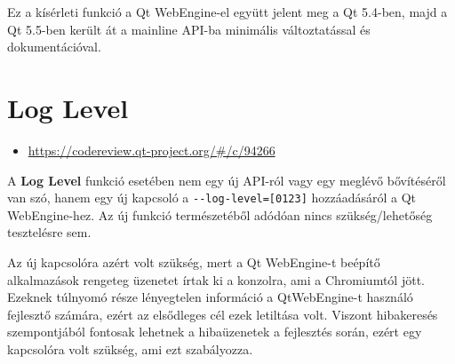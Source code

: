 \documentclass[12pt]{report}
\let\origurl\url
\renewcommand{\url}[1]{%
    \textcolor{blue}{\origurl{#1}}
}
\newcommand{\gerrit}[1]{%
    \textcolor{qtgreen}{\origurl{https://codereview.qt-project.org/\#/c/#1}}
}
\begin{document}
Ez a kísérleti funkció a Qt WebEngine-el együtt jelent meg a Qt 5.4-ben, majd a Qt 5.5-ben
került át a mainline API-ba minimális változtatással és dokumentációval.


\section{Log Level}

\begin{center}
    \begin{reviewbox}
        \begin{itemize}
            \renewcommand{\labelitemi}{\textcolor{qtgreen}{$\blacktriangleright$}}
            \item \gerrit{94266}
        \end{itemize}
    \end{reviewbox}
\end{center}

\noindent
A \textbf{Log Level} funkció esetében nem egy új API-ról vagy egy meglévő bővítéséről van
szó, hanem egy új kapcsoló a \texttt{-{}-log-level=[0123]} hozzáadásáról a Qt WebEngine-hez.
Az új funkció természetéből adódóan nincs szükség/lehetőség tesztelésre sem.

Az új kapcsolóra azért volt szükség, mert a Qt WebEngine-t beépítő alkalmazások rengeteg
üzenetet írtak ki a konzolra, ami a Chromiumtól jött. Ezeknek túlnyomó része lényegtelen
információ a QtWebEngine-t használó fejlesztő számára, ezért az elsődleges cél ezek
letiltása volt. Viszont hibakeresés szempontjából fontosak lehetnek a hibaüzenetek a
fejlesztés során, ezért egy kapcsolóra volt szükség, ami ezt szabályozza.
\end{document}
